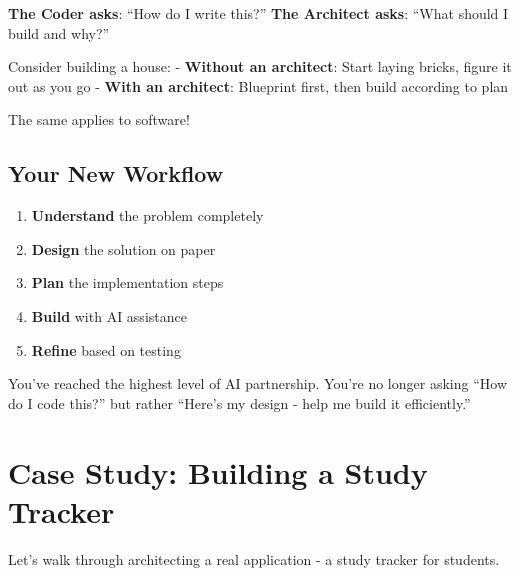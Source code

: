 \documentclass[
  letterpaper,
  DIV=11,
  numbers=noendperiod,
  oneside]{scrreprt}
\providecommand{\tightlist}{%
  \setlength{\itemsep}{0pt}\setlength{\parskip}{0pt}}\usepackage{longtable,booktabs,array}
\begin{document}
\textbf{The Coder asks}: ``How do I write this?'' \textbf{The Architect
asks}: ``What should I build and why?''

Consider building a house: - \textbf{Without an architect}: Start laying
bricks, figure it out as you go - \textbf{With an architect}: Blueprint
first, then build according to plan

The same applies to software!

\subsection{Your New Workflow}\label{your-new-workflow}

\begin{enumerate}
\def\labelenumi{\arabic{enumi}.}
\tightlist
\item
  \textbf{Understand} the problem completely
\item
  \textbf{Design} the solution on paper
\item
  \textbf{Plan} the implementation steps
\item
  \textbf{Build} with AI assistance
\item
  \textbf{Refine} based on testing
\end{enumerate}

\begin{tcolorbox}[enhanced jigsaw, opacityback=0, colback=white, colframe=quarto-callout-important-color-frame, breakable, titlerule=0mm, coltitle=black, rightrule=.15mm, colbacktitle=quarto-callout-important-color!10!white, left=2mm, bottomtitle=1mm, bottomrule=.15mm, title=\textcolor{quarto-callout-important-color}{\faExclamation}\hspace{0.5em}{The AI Partnership Evolution}, opacitybacktitle=0.6, toptitle=1mm, leftrule=.75mm, arc=.35mm, toprule=.15mm]

You've reached the highest level of AI partnership. You're no longer
asking ``How do I code this?'' but rather ``Here's my design - help me
build it efficiently.''

\end{tcolorbox}

\section{Case Study: Building a Study
Tracker}\label{case-study-building-a-study-tracker}

Let's walk through architecting a real application - a study tracker for
students.
\end{document}
